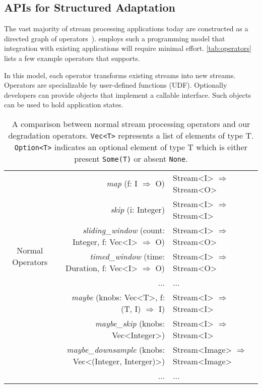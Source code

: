 \subsection{APIs for Structured Adaptation}
\label{sec:struct-adapt}

The vast majority of stream processing applications today are constructed as a
directed graph of operators~\cite{toshniwal2014storm, zaharia2013discretized}).
\sysname{} employs such a programming model that integration with existing
applications will require minimal effort. \autoref{tab:operators} lists a few
example operators that \sysname{} supports.

In this model, each operator transforms existing streams into new
streams. Operators are specializable by user-defined functions (UDF). Optionally
developers can provide objects that implement a callable interface. Such objects
can be used to hold application states.

\begin{table*}
  \small
  \centering
  \begin{tabular}{ c r l }
    \toprule
    \multirow{7}{*}{Normal Operators}
    & \textit{map} (f: I $\Rightarrow$ O) & Stream<I> $\Rightarrow$ Stream<O> \\
    & \textit{skip} (i: Integer) & Stream<I> $\Rightarrow$
                                   Stream<I> \\
    & \textit{sliding\_window} (count: Integer, f: Vec<I> $\Rightarrow$ O) & Stream<I> $\Rightarrow$
                                                                            Stream<O> \\
    & \textit{timed\_window} (time: Duration, f: Vec<I> $\Rightarrow$ O) & Stream<I> $\Rightarrow$
                                                                          Stream<O> \\
    & ... & ... \\
    \midrule
    \multirow{4}{*}{Degradation Operators}
    & \textit{maybe} (knobs: Vec<T>, f:  (T, I) $\Rightarrow$ I) & Stream<I> $\Rightarrow$
                                                                 Stream<I> \\
    & \textit{maybe\_skip} (knobs: Vec<Integer>) & Stream<I> $\Rightarrow$ Stream<I> \\
    & \textit{maybe\_downsample} (knobs: Vec<(Integer, Interger)>) & Stream<Image> $\Rightarrow$ Stream<Image> \\
    & ... & ... \\
    \bottomrule
  \end{tabular}
  \caption{A comparison between normal stream processing operators and our
    degradation operators. \texttt{Vec<T>} represents a list of elements of type
    T. \texttt{Option<T>} indicates an optional element of type T which is
    either present \texttt{Some(T)} or absent \texttt{None}.}
  \label{tab:operators}
\end{table*}

